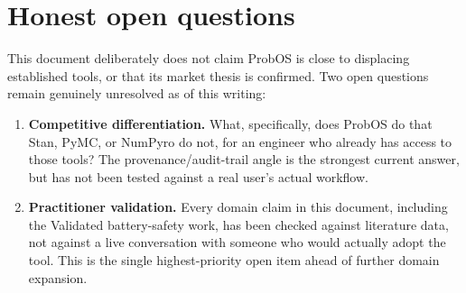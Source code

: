 \documentclass[11pt]{article}
\begin{document}
\section*{Honest open questions}
This document deliberately does not claim ProbOS is close to
displacing established tools, or that its market thesis is confirmed.
Two open questions remain genuinely unresolved as of this writing:
\begin{enumerate}[leftmargin=*]
  \item \textbf{Competitive differentiation.} What, specifically, does
    ProbOS do that Stan, PyMC, or NumPyro do not, for an engineer who
    already has access to those tools? The provenance/audit-trail
    angle is the strongest current answer, but has not been tested
    against a real user's actual workflow.
  \item \textbf{Practitioner validation.} Every domain claim in this
    document, including the Validated battery-safety work, has been
    checked against literature data, not against a live conversation
    with someone who would actually adopt the tool. This is the
    single highest-priority open item ahead of further domain
    expansion.
\end{enumerate}
\end{document}
